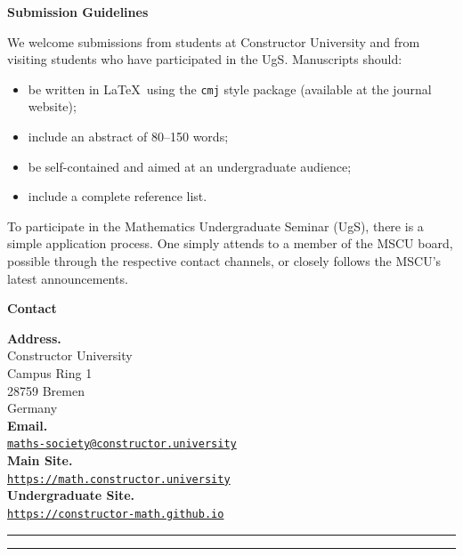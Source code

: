 \hfill
\begin{minipage}[t]{0.47\textwidth}

  {\large\bfseries\color{cmjcrimson}Submission Guidelines}

  \vspace{\internal}

  We welcome submissions from students at Constructor University and from
  visiting students who have participated in the UgS.
  Manuscripts should:
  \begin{itemize}[leftmargin=1.2em, itemsep=0.2em]
    \item be written in \LaTeX\ using the \texttt{cmj} style package
          (available at the journal website);
    \item include an abstract of 80--150 words;
    \item be self-contained and aimed at an undergraduate audience;
    \item include a complete reference list.
  \end{itemize}


  To participate in the Mathematics Undergraduate Seminar (UgS), there is a simple application 
  process. One simply attends to a member of the MSCU board, possible through
  the respective contact channels, or closely follows the MSCU's latest
  announcements.

  \vspace{\external}

    {\large\bfseries\color{cmjcrimson}Contact}

  \vspace{\internal}
  \textbf{Address.}\\
  Constructor University \\
  Campus Ring 1\\
  28759 Bremen\\
  Germany\\[0.2cm]
  \textbf{Email.}\\
  \href{mailto:constructor.maths@gmail.com}{
    \texttt{maths-society@constructor.university}
    }\\[0.2cm]
  \textbf{Main Site.}\\
  \href{https://math.constructor.university/}{
    \texttt{https://math.constructor.university}
  }\\[0.2cm]
  \textbf{Undergraduate Site.}\\
  \href{https://constructor-math.github.io/Home Page/landing.html}{
    \texttt{https://constructor-math.github.io}
    }\\

  \vspace{\external}

  \noindent\textcolor{cmjgold}{\rule{\textwidth}{1.2pt}}


\end{minipage}

\vspace{0.8cm}
\noindent\textcolor{cmjgold}{\rule{\textwidth}{1.2pt}}
